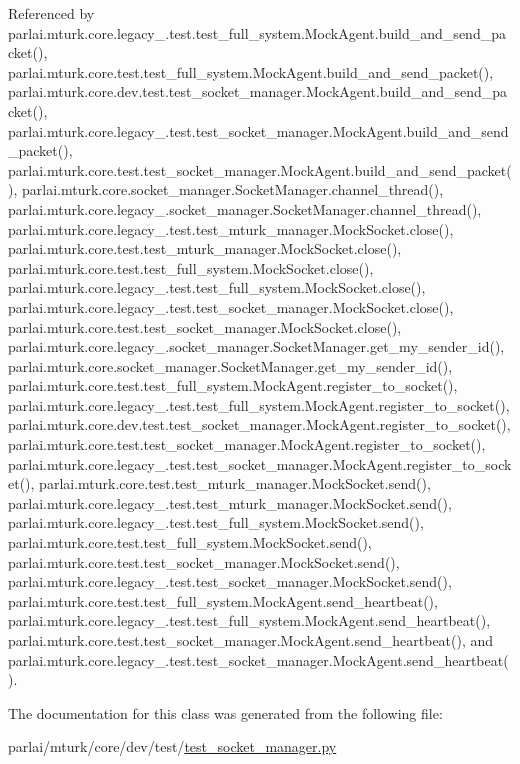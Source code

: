 Referenced by parlai.\+mturk.\+core.\+legacy\+\_.\+test.\+test\+\_\+full\+\_\+system.\+Mock\+Agent.\+build\+\_\+and\+\_\+send\+\_\+packet(), parlai.\+mturk.\+core.\+test.\+test\+\_\+full\+\_\+system.\+Mock\+Agent.\+build\+\_\+and\+\_\+send\+\_\+packet(), parlai.\+mturk.\+core.\+dev.\+test.\+test\+\_\+socket\+\_\+manager.\+Mock\+Agent.\+build\+\_\+and\+\_\+send\+\_\+packet(), parlai.\+mturk.\+core.\+legacy\+\_.\+test.\+test\+\_\+socket\+\_\+manager.\+Mock\+Agent.\+build\+\_\+and\+\_\+send\+\_\+packet(), parlai.\+mturk.\+core.\+test.\+test\+\_\+socket\+\_\+manager.\+Mock\+Agent.\+build\+\_\+and\+\_\+send\+\_\+packet(), parlai.\+mturk.\+core.\+socket\+\_\+manager.\+Socket\+Manager.\+channel\+\_\+thread(), parlai.\+mturk.\+core.\+legacy\+\_.\+socket\+\_\+manager.\+Socket\+Manager.\+channel\+\_\+thread(), parlai.\+mturk.\+core.\+legacy\+\_.\+test.\+test\+\_\+mturk\+\_\+manager.\+Mock\+Socket.\+close(), parlai.\+mturk.\+core.\+test.\+test\+\_\+mturk\+\_\+manager.\+Mock\+Socket.\+close(), parlai.\+mturk.\+core.\+test.\+test\+\_\+full\+\_\+system.\+Mock\+Socket.\+close(), parlai.\+mturk.\+core.\+legacy\+\_.\+test.\+test\+\_\+full\+\_\+system.\+Mock\+Socket.\+close(), parlai.\+mturk.\+core.\+legacy\+\_.\+test.\+test\+\_\+socket\+\_\+manager.\+Mock\+Socket.\+close(), parlai.\+mturk.\+core.\+test.\+test\+\_\+socket\+\_\+manager.\+Mock\+Socket.\+close(), parlai.\+mturk.\+core.\+legacy\+\_.\+socket\+\_\+manager.\+Socket\+Manager.\+get\+\_\+my\+\_\+sender\+\_\+id(), parlai.\+mturk.\+core.\+socket\+\_\+manager.\+Socket\+Manager.\+get\+\_\+my\+\_\+sender\+\_\+id(), parlai.\+mturk.\+core.\+test.\+test\+\_\+full\+\_\+system.\+Mock\+Agent.\+register\+\_\+to\+\_\+socket(), parlai.\+mturk.\+core.\+legacy\+\_.\+test.\+test\+\_\+full\+\_\+system.\+Mock\+Agent.\+register\+\_\+to\+\_\+socket(), parlai.\+mturk.\+core.\+dev.\+test.\+test\+\_\+socket\+\_\+manager.\+Mock\+Agent.\+register\+\_\+to\+\_\+socket(), parlai.\+mturk.\+core.\+test.\+test\+\_\+socket\+\_\+manager.\+Mock\+Agent.\+register\+\_\+to\+\_\+socket(), parlai.\+mturk.\+core.\+legacy\+\_.\+test.\+test\+\_\+socket\+\_\+manager.\+Mock\+Agent.\+register\+\_\+to\+\_\+socket(), parlai.\+mturk.\+core.\+test.\+test\+\_\+mturk\+\_\+manager.\+Mock\+Socket.\+send(), parlai.\+mturk.\+core.\+legacy\+\_.\+test.\+test\+\_\+mturk\+\_\+manager.\+Mock\+Socket.\+send(), parlai.\+mturk.\+core.\+legacy\+\_.\+test.\+test\+\_\+full\+\_\+system.\+Mock\+Socket.\+send(), parlai.\+mturk.\+core.\+test.\+test\+\_\+full\+\_\+system.\+Mock\+Socket.\+send(), parlai.\+mturk.\+core.\+test.\+test\+\_\+socket\+\_\+manager.\+Mock\+Socket.\+send(), parlai.\+mturk.\+core.\+legacy\+\_.\+test.\+test\+\_\+socket\+\_\+manager.\+Mock\+Socket.\+send(), parlai.\+mturk.\+core.\+test.\+test\+\_\+full\+\_\+system.\+Mock\+Agent.\+send\+\_\+heartbeat(), parlai.\+mturk.\+core.\+legacy\+\_.\+test.\+test\+\_\+full\+\_\+system.\+Mock\+Agent.\+send\+\_\+heartbeat(), parlai.\+mturk.\+core.\+test.\+test\+\_\+socket\+\_\+manager.\+Mock\+Agent.\+send\+\_\+heartbeat(), and parlai.\+mturk.\+core.\+legacy\+\_.\+test.\+test\+\_\+socket\+\_\+manager.\+Mock\+Agent.\+send\+\_\+heartbeat().



The documentation for this class was generated from the following file\+:\begin{DoxyCompactItemize}
\item 
parlai/mturk/core/dev/test/\hyperlink{dev_2test_2test__socket__manager_8py}{test\+\_\+socket\+\_\+manager.\+py}\end{DoxyCompactItemize}
